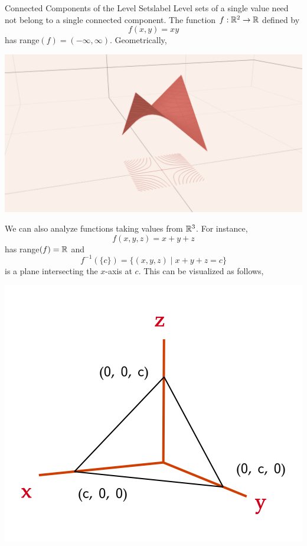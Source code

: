 \begin{ex}{Connected Components of the Level Sets}{label}
    Level sets of a single value need not belong to a single connected component. The function $f: \mathbb{R}^2 \rightarrow \mathbb{R}$ defined by
    \[f(x, y) = x y\]
     has range$(f) = (-\infty, \infty)$. Geometrically,
    \begin{center}
        \includegraphics[width=\linewidth]{figures/wk-1/fig-00.png}
    \end{center}
\end{ex}

\begin{marginfigure}
    We can also analyze functions taking values from $\mathbb{R}^3$. For instance,
    \[f(x, y, z) = x + y + z\]
    has range$(f) = \mathbb{R}$ and
    \[f^{-1}(\{c\}) = \{(x, y, z) \mid x + y + z = c\}\]
    is a plane intersecting the $x$-axis at $c$. This can be visualized as follows,
    \begin{center}
        \includegraphics[width=0.8\linewidth]{figures/wk-1/fig-13b.png}
    \end{center}
\end{marginfigure}

